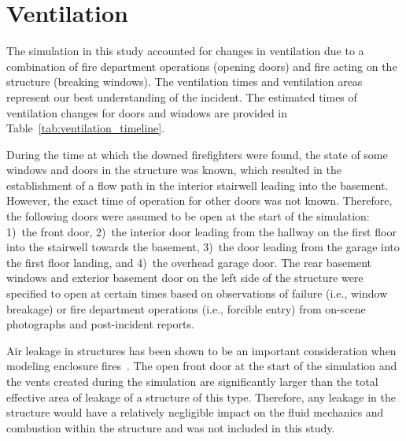 \documentclass[12pt,oneside]{book}
\begin{document}
\section{Ventilation}
\label{sec:ventilation}

The simulation in this study accounted for changes in ventilation due to a combination of fire department operations (opening doors) and fire acting on the structure (breaking windows). The ventilation times and ventilation areas represent our best understanding of the incident. The estimated times of ventilation changes for doors and windows are provided in Table~\ref{tab:ventilation_timeline}.

During the time at which the downed firefighters were found, the state of some windows and doors in the structure was known, which resulted in the establishment of a flow path in the interior stairwell leading into the basement. However, the exact time of operation for other doors was not known. Therefore, the following doors were assumed to be open at the start of the simulation: 1)~the front door, 2)~the interior door leading from the hallway on the first floor into the stairwell towards the basement, 3)~the door leading from the garage into the first floor landing, and 4)~the overhead garage door. The rear basement windows and exterior basement door on the left side of the structure were specified to open at certain times based on observations of failure (i.e., window breakage) or fire department operations (i.e., forcible entry) from on-scene photographs and post-incident reports.

Air leakage in structures has been shown to be an important consideration when modeling enclosure fires~\cite{beal2009}. The open front door at the start of the simulation and the vents created during the simulation are significantly larger than the total effective area of leakage of a structure of this type. Therefore, any leakage in the structure would have a relatively negligible impact on the fluid mechanics and combustion within the structure and was not included in this study.
\end{document}
